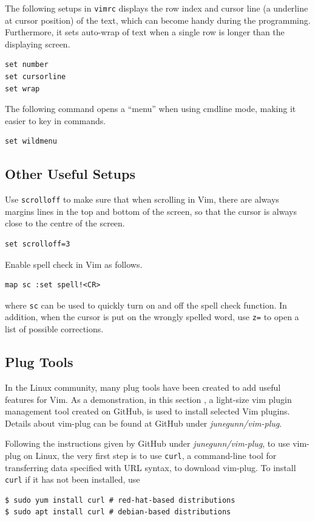 The following setups in \verb|vimrc| displays the row index and cursor line (a underline at cursor position) of the text, which can become handy during the programming. Furthermore, it sets auto-wrap of text when a single row is longer than the displaying screen.
\begin{lstlisting}
set number
set cursorline
set wrap
\end{lstlisting}

The following command opens a ``menu'' when using cmdline mode, making it easier to key in commands.
\begin{lstlisting}
set wildmenu
\end{lstlisting}

\subsection{Other Useful Setups}

Use \verb|scrolloff| to make sure that when scrolling in Vim, there are always margins lines in the top and bottom of the screen, so that the cursor is always close to the centre of the screen.
\begin{lstlisting}
set scrolloff=3
\end{lstlisting}

Enable spell check in Vim as follows.
\begin{lstlisting}
map sc :set spell!<CR>
\end{lstlisting}
where \verb|sc| can be used to quickly turn on and off the spell check function. In addition, when the cursor is put on the wrongly spelled word, use \verb|z=| to open a list of possible corrections.

\subsection{Plug Tools}

In the Linux community, many plug tools have been created to add useful features for Vim. As a demonstration, in this section , a light-size vim plugin management tool created on GitHub, is used to install selected Vim plugins. Details about vim-plug can be found at GitHub under \textit{junegunn/vim-plug}.

Following the instructions given by GitHub under \textit{junegunn/vim-plug}, to use vim-plug on Linux, the very first step is to use \verb|curl|, a command-line tool for transferring data specified with URL syntax, to download vim-plug. To install \verb|curl| if it has not been installed, use
\begin{lstlisting}
$ sudo yum install curl # red-hat-based distributions
$ sudo apt install curl # debian-based distributions
\end{lstlisting}

